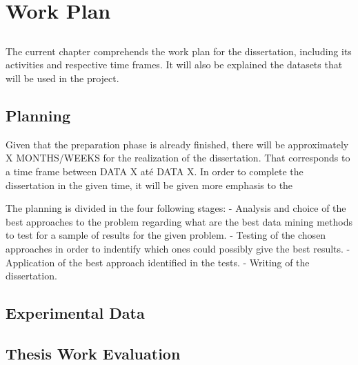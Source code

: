 \chapter{Work Plan}\label{chap:chap3}

\section*{}

The current chapter comprehends the work plan for the dissertation, including its activities and respective time frames. It will also be explained the datasets that will be used in the project.

\section{Planning}

Given that the preparation phase is already finished, there will be approximately X MONTHS/WEEKS for the realization of the dissertation. That corresponds to a time frame between DATA X até DATA X. In order to complete the dissertation in the given time, it will be given more emphasis to the 

The planning is divided in the four following stages:
- Analysis and choice of the best approaches to the problem regarding what are the best data mining methods to test for a sample of results for the given problem.
- Testing of the chosen approaches in order to indentify which ones could possibly give the best results.
- Application of the best approach identified in the tests.
- Writing of the dissertation.


\section{Experimental Data}


\section{Thesis Work Evaluation}


